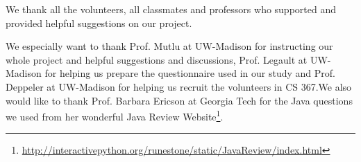 \documentclass{sigchi}
\begin{document}
We thank all the volunteers, all classmates and professors who supported and provided helpful suggestions on our project. 

We especially want to thank Prof. Mutlu at UW-Madison for instructing our whole project and helpful suggestions and discussions,  Prof. Legault at UW-Madison for helping us prepare the questionnaire used in our study and Prof. Deppeler at UW-Madison for helping us recruit the volunteers in CS 367.We also would like to thank Prof. Barbara Ericson at Georgia Tech for the Java questions we used from her wonderful Java Review Website\footnote{\url{http://interactivepython.org/runestone/static/JavaReview/index.html}}.



\end{document}
